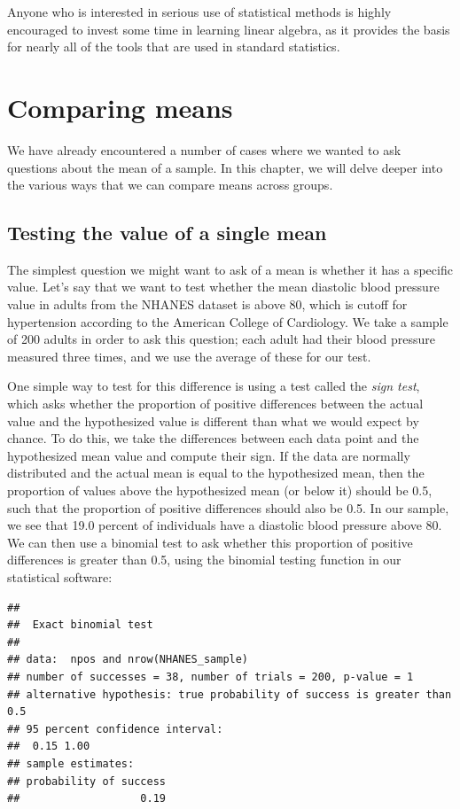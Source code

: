 \documentclass[12pt,]{book}
\theoremstyle{definition}
\theoremstyle{definition}
\theoremstyle{definition}
\theoremstyle{remark}
\begin{document}
Anyone who is interested in serious use of statistical methods is highly encouraged to invest some time in learning linear algebra, as it provides the basis for nearly all of the tools that are used in standard statistics.

\hypertarget{comparing-means}{%
\chapter{Comparing means}\label{comparing-means}}

We have already encountered a number of cases where we wanted to ask questions about the mean of a sample. In this chapter, we will delve deeper into the various ways that we can compare means across groups.

\hypertarget{single-mean}{%
\section{Testing the value of a single mean}\label{single-mean}}

The simplest question we might want to ask of a mean is whether it has a specific value. Let's say that we want to test whether the mean diastolic blood pressure value in adults from the NHANES dataset is above 80, which is cutoff for hypertension according to the American College of Cardiology. We take a sample of 200 adults in order to ask this question; each adult had their blood pressure measured three times, and we use the average of these for our test.

One simple way to test for this difference is using a test called the \emph{sign test}, which asks whether the proportion of positive differences between the actual value and the hypothesized value is different than what we would expect by chance. To do this, we take the differences between each data point and the hypothesized mean value and compute their sign. If the data are normally distributed and the actual mean is equal to the hypothesized mean, then the proportion of values above the hypothesized mean (or below it) should be 0.5, such that the proportion of positive differences should also be 0.5. In our sample, we see that 19.0 percent of individuals have a diastolic blood pressure above 80. We can then use a binomial test to ask whether this proportion of positive differences is greater than 0.5, using the binomial testing function in our statistical software:

\begin{verbatim}
## 
##  Exact binomial test
## 
## data:  npos and nrow(NHANES_sample)
## number of successes = 38, number of trials = 200, p-value = 1
## alternative hypothesis: true probability of success is greater than 0.5
## 95 percent confidence interval:
##  0.15 1.00
## sample estimates:
## probability of success 
##                   0.19
\end{verbatim}
\end{document}
